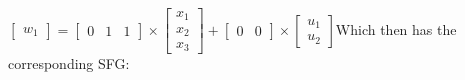 \newline
$\left[ \begin{array}{c} w_1  \end{array} \right]
=  \begin{bmatrix} 0 & 1 & 1\end{bmatrix} \times \left[ \begin{array}{c} x_1 \\ x_2 \\ x_3 \end{array} \right] + \begin{bmatrix} 0 & 0 \end{bmatrix} \times \left[ \begin{array}{c} u_1 \\ u_2 \end{array} \right]$\newline Which then has the corresponding SFG:\newline
\setlength\fboxsep{0pt}
\setlength\fboxrule{0.5pt}
\\\newline
